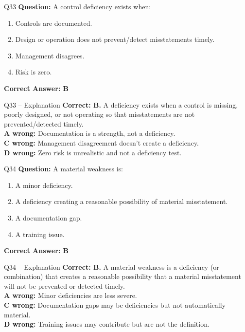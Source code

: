 \documentclass[aspectratio=169,10pt]{beamer}
\begin{document}
	\begin{frame}[t]{Q33}
		\small
		\textbf{Question:} A control deficiency exists when:
		\begin{enumerate}[label=\Alph*.,itemsep=1pt,topsep=2pt]
			\item Controls are documented.
			\item Design or operation does not prevent/detect misstatements timely.
			\item Management disagrees.
			\item Risk is zero.
		\end{enumerate}
		\vspace{4pt}
		\textbf{Correct Answer: B}
	\end{frame}
	
	\begin{frame}[t]{Q33 -- Explanation}
		\small
		\textbf{Correct: B.} A deficiency exists when a control is missing, poorly designed, or not operating so that misstatements are not prevented/detected timely. \\[4pt]
		\textbf{A wrong:} Documentation is a strength, not a deficiency. \\[2pt]
		\textbf{C wrong:} Management disagreement doesn't create a deficiency. \\[2pt]
		\textbf{D wrong:} Zero risk is unrealistic and not a deficiency test.
	\end{frame}
	
	\begin{frame}[t]{Q34}
		\small
		\textbf{Question:} A material weakness is:
		\begin{enumerate}[label=\Alph*.,itemsep=1pt,topsep=2pt]
			\item A minor deficiency.
			\item A deficiency creating a reasonable possibility of material misstatement.
			\item A documentation gap.
			\item A training issue.
		\end{enumerate}
		\vspace{4pt}
		\textbf{Correct Answer: B}
	\end{frame}
	
	\begin{frame}[t]{Q34 -- Explanation}
		\small
		\textbf{Correct: B.} A material weakness is a deficiency (or combination) that creates a reasonable possibility that a material misstatement will not be prevented or detected timely. \\[4pt]
		\textbf{A wrong:} Minor deficiencies are less severe. \\[2pt]
		\textbf{C wrong:} Documentation gaps may be deficiencies but not automatically material. \\[2pt]
		\textbf{D wrong:} Training issues may contribute but are not the definition.
	\end{frame}
	
\end{document}
